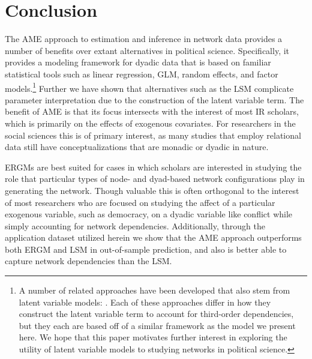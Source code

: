 \section*{\textbf{Conclusion}}

The AME approach to estimation and inference in network data provides a number of benefits over extant alternatives in political science. Specifically, it provides a modeling framework for dyadic data that is based on familiar statistical tools such as linear regression, GLM, random effects, and factor models.\footnote{A number of related approaches have been developed that also stem from latent variable models: \citet{sewell:chen:2015,gollini:murphy:2016,durante:etal:2017,kao:etal:2018}. Each of these approaches differ in how they construct the latent variable term to account for third-order dependencies, but they each are based off of a similar framework as the model we present here. We hope that this paper motivates further interest in exploring the utility of latent variable models to studying networks in political science.} Further we have shown that alternatives such as the LSM complicate parameter interpretation due to the construction of the latent variable term. The benefit of AME is that its focus intersects with the interest of most IR scholars, which is primarily on the effects of exogenous covariates. For researchers in the social sciences this is of primary interest, as many studies that employ relational data still have conceptualizations that are monadic or dyadic in nature.

ERGMs are best suited for cases in which scholars are interested in studying the role that particular types of node- and dyad-based network configurations play in generating the network. Though valuable this is often orthogonal to the interest of most researchers who are focused on studying the affect of a particular exogenous variable, such as democracy, on a dyadic variable like conflict while simply accounting for network dependencies. Additionally, through the application dataset utilized herein we show that the AME approach outperforms both ERGM and LSM in out-of-sample prediction, and also is better able to capture network dependencies than the LSM.

